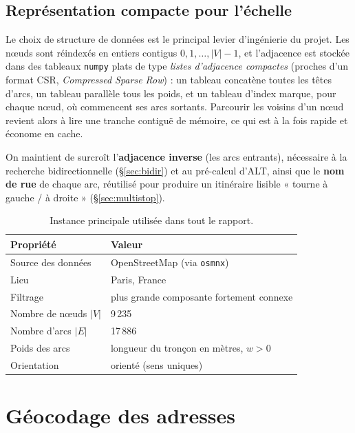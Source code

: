 \subsection{Représentation compacte pour l'échelle}
\label{sec:csr}

Le choix de structure de données est le principal levier d'ingénierie du projet.
Les nœuds sont réindexés en entiers contigus $0, 1, \dots, |V|-1$, et
l'adjacence est stockée dans des tableaux \texttt{numpy} plats de type
\emph{listes d'adjacence compactes} (proches d'un format CSR, \emph{Compressed
Sparse Row}) : un tableau concatène toutes les têtes d'arcs, un tableau parallèle
tous les poids, et un tableau d'index marque, pour chaque nœud, où commencent ses
arcs sortants. Parcourir les voisins d'un nœud revient alors à lire une tranche
contiguë de mémoire, ce qui est à la fois rapide et économe en cache.

\medskip

On maintient de surcroît l'\textbf{adjacence inverse} (les arcs entrants),
nécessaire à la recherche bidirectionnelle (\S\ref{sec:bidir}) et au pré-calcul
d'ALT, ainsi que le \textbf{nom de rue} de chaque arc, réutilisé pour produire un
itinéraire lisible « tourne à gauche / à droite » (\S\ref{sec:multistop}).

\begin{table}[htbp]
  \centering
  \begin{tabular}{@{}ll@{}}
    \toprule
    Propriété & Valeur \\
    \midrule
    Source des données      & OpenStreetMap (via \texttt{osmnx}) \\
    Lieu                    & Paris, France \\
    Filtrage                & plus grande composante fortement connexe \\
    Nombre de nœuds $|V|$   & 9\,235 \\
    Nombre d'arcs $|E|$     & 17\,886 \\
    Poids des arcs          & longueur du tronçon en mètres, $w > 0$ \\
    Orientation             & orienté (sens uniques) \\
    \bottomrule
  \end{tabular}
  \caption{Instance principale utilisée dans tout le rapport.}
  \label{tab:instance}
\end{table}

\section{Géocodage des adresses}
\label{sec:geocodage}

